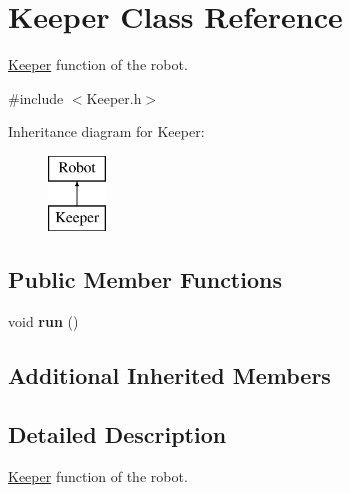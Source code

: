 \hypertarget{class_keeper}{\section{Keeper Class Reference}
\label{class_keeper}
}


\hyperlink{class_keeper}{Keeper} function of the robot.  




{\ttfamily \#include $<$Keeper.\-h$>$}

Inheritance diagram for Keeper\-:\begin{figure}[H]
\begin{center}
\leavevmode
\includegraphics[height=2.000000cm]{class_keeper}
\end{center}
\end{figure}
\subsection*{Public Member Functions}
\begin{DoxyCompactItemize}
\item 
\hypertarget{class_keeper_a2ee9e2e1baa02afa37b0d3f3c471e211}{void {\bfseries run} ()}\label{class_keeper_a2ee9e2e1baa02afa37b0d3f3c471e211}

\end{DoxyCompactItemize}
\subsection*{Additional Inherited Members}


\subsection{Detailed Description}
\hyperlink{class_keeper}{Keeper} function of the robot. 

